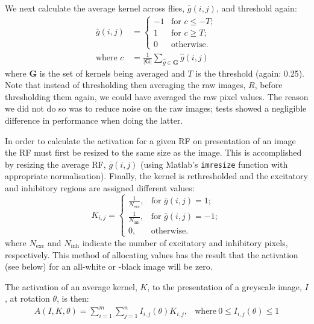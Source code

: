 We next calculate the average kernel across flies, $\bar{g}(i,j)$, and threshold again:
\begin{align*}
\bar{g}(i,j) &= \left\{ \begin{array}{rl}
			-1 & \mbox{for } c \le -T; \\
			 1 & \mbox{for } c \ge T; \\
			 0 & \mbox{otherwise.} 
			\end{array} \right. \\
\mbox{where } c &= \frac{1}{|\mathbf{G}|}\sum\limits_{\hat{g} \in \mathbf{G}} \hat{g}(i,j)
\end{align*}
where $\mathbf{G}$ is the set of kernels being averaged and $T$ is the threshold (again: 0.25). Note that instead of thresholding then averaging the raw images, $R$, before thresholding them again, we could have averaged the raw pixel values. The reason we did not do so was to reduce noise on the raw images; tests showed a negligible difference in performance when doing the latter.

In order to calculate the activation for a given RF on presentation of an image the RF must first be resized to the same size as the image.
This is accomplished by resizing the average RF, $\bar{g}(i,j)$ (using Matlab's \texttt{imresize} function with appropriate normalisation).
Finally, the kernel is rethresholded and the excitatory and inhibitory regions are assigned different values:
$$
K_{i,j} = \left\{
\begin{array}{rl}
\frac{1}{N_\mathrm{exc}}, & \mbox{for } \bar{g}(i,j) = 1; \\
\frac{1}{N_\mathrm{inh}}, & \mbox{for } \bar{g}(i,j) = -1; \\
0, & \mbox{otherwise.}
\end{array}
\right.
$$
where $N_\mathrm{exc}$ and $N_\mathrm{inh}$ indicate the number of excitatory and inhibitory pixels, respectively.
This method of allocating values has the result that the activation (see below) for an all-white or -black image will be zero.

The activation of an average kernel, $K$, to the presentation of a greyscale image, $I$, at rotation $\theta$, is then:
\begin{equation}
\label{eq:act}
\begin{array}{rl}
A(I,K,\theta) = {\sum\limits^m_{i=1} \sum\limits^n_{j=1} I_{i,j}(\theta)K_{i,j}}, &\mathrm{where\ } 0 \le I_{i,j}(\theta) \le 1
\end{array}
\end{equation}

